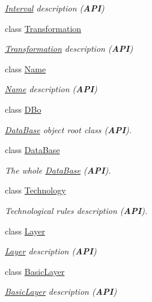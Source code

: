 \begin{DoxyCompactItemize}
\begin{DoxyCompactList}\small\item\em \hyperlink{classHurricane_1_1Interval}{Interval} description ({\bfseries A\-P\-I}) \end{DoxyCompactList}\item 
class \hyperlink{classHurricane_1_1Transformation}{Transformation}
\begin{DoxyCompactList}\small\item\em \hyperlink{classHurricane_1_1Transformation}{Transformation} description ({\bfseries A\-P\-I}) \end{DoxyCompactList}\item 
class \hyperlink{classHurricane_1_1Name}{Name}
\begin{DoxyCompactList}\small\item\em \hyperlink{classHurricane_1_1Name}{Name} description ({\bfseries A\-P\-I}) \end{DoxyCompactList}\item 
class \hyperlink{classHurricane_1_1DBo}{D\-Bo}
\begin{DoxyCompactList}\small\item\em \hyperlink{classHurricane_1_1DataBase}{Data\-Base} object root class ({\bfseries A\-P\-I}). \end{DoxyCompactList}\item 
class \hyperlink{classHurricane_1_1DataBase}{Data\-Base}
\begin{DoxyCompactList}\small\item\em The whole \hyperlink{classHurricane_1_1DataBase}{Data\-Base} ({\bfseries A\-P\-I}). \end{DoxyCompactList}\item 
class \hyperlink{classHurricane_1_1Technology}{Technology}
\begin{DoxyCompactList}\small\item\em Technological rules description ({\bfseries A\-P\-I}). \end{DoxyCompactList}\item 
class \hyperlink{classHurricane_1_1Layer}{Layer}
\begin{DoxyCompactList}\small\item\em \hyperlink{classHurricane_1_1Layer}{Layer} description ({\bfseries A\-P\-I}) \end{DoxyCompactList}\item 
class \hyperlink{classHurricane_1_1BasicLayer}{Basic\-Layer}
\begin{DoxyCompactList}\small\item\em \hyperlink{classHurricane_1_1BasicLayer}{Basic\-Layer} description ({\bfseries A\-P\-I}) \end{DoxyCompactList}\item 

\end{DoxyCompactItemize}
